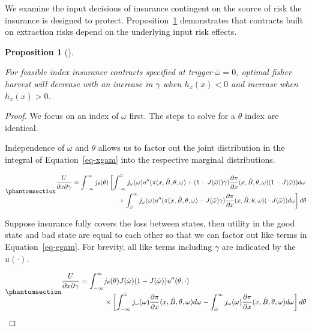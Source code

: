\documentclass[
  letterpaper,
  DIV=11,
  numbers=noendperiod]{scrartcl}
\theoremstyle{plain}
\theoremstyle{plain}
\newtheorem{proposition}{Proposition}[section]
\theoremstyle{remark}
\begin{document}
We examine the input decisions of insurance contingent on the source of
risk the insurance is designed to protect. Proposition~\ref{prp-ind}
demonstrates that contracts built on extraction risks depend on the
underlying input risk effects.

\begin{proposition}[]\protect\hypertarget{prp-ind}{}\label{prp-ind}

For feasible index insurance contracts specified at trigger
\(\bar\omega=0\), optimal fisher harvest will decrease with an increase
in \(\gamma\) when \(h_x(x)<0\) and increase when \(h_x(x)>0\).

\end{proposition}

\begin{proof}
We focus on an index of \(\omega\) first. The steps to solve for a
\(\theta\) index are identical.

Independence of \(\omega\) and \(\theta\) allows us to factor out the
joint distribution in the integral of Equation~\ref{eq-xgam} into the
respective marginal distributions.

\begin{equation}\phantomsection\label{eq-egam}{
\begin{aligned}
\frac{U}{\partial x \partial \gamma}=\int^{\infty}_{-\infty}j_{\theta}(\theta)\left[ \int^{\bar\omega}_{-\infty}j_{\omega}(\omega)u''(\pi(x,\hat{B},\theta,\omega)+(1-J(\bar\omega))\gamma)\frac{\partial \pi}{\partial x}(x,\hat{B},\theta,\omega)(1-J(\bar\omega))d\omega\right.\\
+\left.\int^{\infty}_{\bar{\omega}}j_{\omega}(\omega) u''(\pi(x,\hat{B},\theta,\omega)-J(\bar\omega)\gamma)\frac{\partial \pi}{\partial x}(x,\hat{B},\theta,\omega)(-J(\bar\omega))d\omega\right] d\theta
\end{aligned}
}\end{equation}

Suppose insurance fully covers the loss between states, then utility in
the good state and bad state are equal to each other so that we can
factor out like terms in Equation~\ref{eq-egam}. For brevity, all like
terms including \(\gamma\) are indicated by the \(u(\cdot)\).

\begin{equation}\phantomsection\label{eq-simp}{
\begin{aligned}
\frac{U}{\partial x \partial \gamma}=\int^{\infty}_{-\infty}&j_{\theta}(\theta)J(\bar\omega)(1-J(\bar\omega))u''(\theta,\cdot)\\
&\times\left[ \int^{\bar\omega}_{-\infty}j_{\omega}(\omega)\frac{\partial \pi}{\partial x}(x,\hat{B},\theta,\omega)d\omega
-\int^{\infty}_{\bar{\omega}}j_{\omega}(\omega)\frac{\partial \pi}{\partial x}(x,\hat{B},\theta,\omega)d\omega\right] d\theta
\end{aligned}
}\end{equation}


\end{proof}
\end{document}

